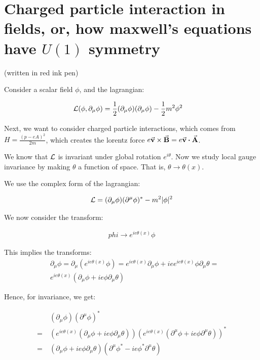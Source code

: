 \chapter{Charged particle interaction in fields, or, how maxwell's equations have $U(1)$ symmetry}
(written in red ink pen)

Consider a scalar field $\phi$, and the lagrangian:

\begin{align*}
    &\mathcal{L}(\phi, \partial_\mu \phi) = \frac{1}{2} (\partial_\mu \phi) (\partial_\mu \phi) - \frac{1}{2} m^2 \phi^2
\end{align*}

Next, we want to consider charged particle interactions, which comes from
$H = \frac{(p - eA)^2}{2m}$, which creates the lorentz force $e \va v \times \va B = e \va v \vdot \va A$.

We know that $\mathcal{L}$ is invariant under global rotation $e^{i \theta}$. Now we
study local gauge invariance by making $\theta$ a function of space. That is,
$\theta \to \theta(x)$.

We use the complex form of the lagrangian:

\begin{align*}
    \mathcal{L} = (\partial_\mu \phi) (\partial^\mu \phi)^* - m^2|\phi|^2
\end{align*}

We now consider the transform:

\begin{align*}
    phi \to e^{i e \theta(x)} \phi
\end{align*}

This implies the transforms:
\begin{align*}
    &\partial_\mu \phi = 
    \partial_\mu (e^{i e \theta(x)} \phi) = 
    e^{i e \theta(x)} \partial_\mu \phi + i e e^{i e \theta(x)} \phi \partial_\mu \theta = \\
    &e^{i e \theta(x)}(\partial_\mu \phi + i e \phi \partial_\mu \theta)
\end{align*}

Hence, for invariance, we get:

\begin{align*}
    &(\partial_\mu \phi ) (\partial^\mu \phi )^*  \\
    =~&(e^{i e \theta(x)}(\partial_\mu \phi + i e \phi \partial_\mu \theta))
    (e^{i e \theta(x)}(\partial^\mu \phi + i e \phi \partial^\mu \theta))^* \\
     =~&(\partial_\mu \phi + i e \phi \partial_\mu \theta)(\partial^\mu \phi^* - i e \phi^* \partial^\mu \theta)
\end{align*}

